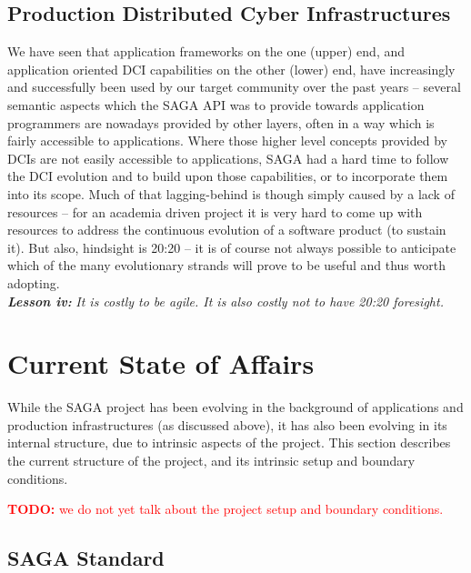 \documentclass[]{article}
\newcommand{\I}[1]{\textit{#1}}
\newcommand{\B}[1]{\textbf{#1}}
\newcommand{\BI}[1]{\textbf{\textit{#1}}}
\newcommand{\todo}[1]{{\textcolor{red}{\B{TODO:} #1 }}}
\begin{document}
\subsection{Production Distributed Cyber Infrastructures}

  We have seen that application frameworks on the one (upper) end, and
  application oriented DCI capabilities on the other (lower) end, have
  increasingly and successfully been used by our target community over
  the past years -- several semantic aspects which the SAGA API was to
  provide towards application programmers are nowadays provided by
  other layers, often in a way which is fairly accessible to
  applications.  Where those higher level concepts provided by DCIs
  are not easily accessible to applications, SAGA had a hard time to
  follow the DCI evolution and to build upon those capabilities, or to
  incorporate them into its scope.  Much of that lagging-behind is
  though simply caused by a lack of resources -- for an academia
  driven project it is very hard to come up with resources to address
  the continuous evolution of a software product (to sustain it).  But
  also, hindsight is 20:20 -- it is of course not always possible to
  anticipate which of the many evolutionary strands will prove to be
  useful and thus worth adopting.\\
  \BI{Lesson iv:} \I{It is costly to be agile. It is also costly not to 
  have 20:20 foresight.}



%


\section{Current State of Affairs}
\label{sec:state}


 While the SAGA project has been evolving in the background of
 applications and production infrastructures (as discussed above), it
 has also been evolving in its internal structure, due to intrinsic
 aspects of the project.  This section describes the current structure
 of the project, and its intrinsic setup and boundary conditions.

 \todo{we do not yet talk about the project setup and boundary
 conditions.}


\subsection{SAGA Standard}
\end{document}
